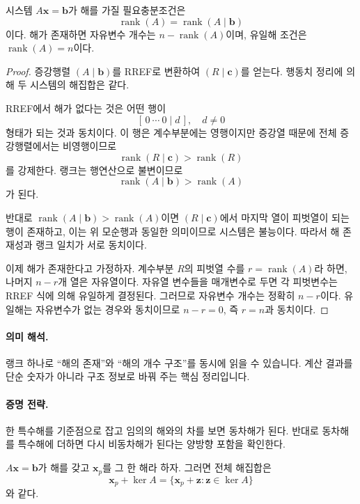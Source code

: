 \begin{theorem}
시스템 $A\mathbf{x}=\mathbf{b}$가 해를 가질 필요충분조건은
\[
\operatorname{rank}(A)=\operatorname{rank}(A\mid \mathbf{b})
\]
이다. 해가 존재하면 자유변수 개수는 $n-\operatorname{rank}(A)$이며, 유일해 조건은 $\operatorname{rank}(A)=n$이다.
\end{theorem}

\begin{proof}
증강행렬 $(A\mid\mathbf{b})$를 RREF로 변환하여 $(R\mid\mathbf{c})$를 얻는다. 행동치 정리에 의해 두 시스템의 해집합은 같다.

RREF에서 해가 없다는 것은 어떤 행이
\[
[\,0\ \cdots\ 0\mid d\,],\quad d\neq 0
\]
형태가 되는 것과 동치이다. 이 행은 계수부분에는 영행이지만 증강열 때문에 전체 증강행렬에서는 비영행이므로
\[
\operatorname{rank}(R\mid\mathbf{c})>\operatorname{rank}(R)
\]
를 강제한다. 랭크는 행연산으로 불변이므로
\[
\operatorname{rank}(A\mid\mathbf{b})>\operatorname{rank}(A)
\]
가 된다.

반대로 \(\operatorname{rank}(A\mid\mathbf{b})>\operatorname{rank}(A)\)이면 \((R\mid\mathbf{c})\)에서 마지막 열이 피벗열이 되는 행이 존재하고, 이는 위 모순행과 동일한 의미이므로 시스템은 불능이다. 따라서 해 존재성과 랭크 일치가 서로 동치이다.

이제 해가 존재한다고 가정하자. 계수부분 \(R\)의 피벗열 수를 \(r=\operatorname{rank}(A)\)라 하면, 나머지 \(n-r\)개 열은 자유열이다. 자유열 변수들을 매개변수로 두면 각 피벗변수는 RREF 식에 의해 유일하게 결정된다. 그러므로 자유변수 개수는 정확히 \(n-r\)이다. 유일해는 자유변수가 없는 경우와 동치이므로 \(n-r=0\), 즉 \(r=n\)과 동치이다.
\end{proof}

\paragraph{의미 해석.}
랭크 하나로 ``해의 존재''와 ``해의 개수 구조''를 동시에 읽을 수 있습니다. 계산 결과를 단순 숫자가 아니라 구조 정보로 바꿔 주는 핵심 정리입니다.

\paragraph{증명 전략.}
한 특수해를 기준점으로 잡고 임의의 해와의 차를 보면 동차해가 된다. 반대로 동차해를 특수해에 더하면 다시 비동차해가 된다는 양방향 포함을 확인한다.

\begin{theorem}
$A\mathbf{x}=\mathbf{b}$가 해를 갖고 $\mathbf{x}_p$를 그 한 해라 하자. 그러면 전체 해집합은
\[
\mathbf{x}_p+\ker A=\{\mathbf{x}_p+\mathbf{z}:\mathbf{z}\in\ker A\}
\]
와 같다.
\end{theorem}


